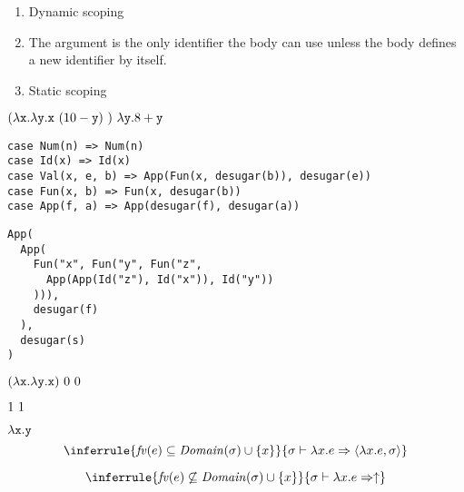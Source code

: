 \textbf{}
\begin{enumerate}
  \item Dynamic scoping
  \item The argument is the only identifier the body can use unless the body defines a new identifier by itself.
  \item Static scoping
\end{enumerate}

\textbf{}

$(\lambda\texttt{x}.\lambda\texttt{y}.\texttt{x}\ (10-\texttt{y})\ )\ \lambda\texttt{y}.8+\texttt{y}$
\\

\textbf{}
\vspace{-1em}
\begin{verbatim}
case Num(n) => Num(n)
case Id(x) => Id(x)
case Val(x, e, b) => App(Fun(x, desugar(b)), desugar(e))
case Fun(x, b) => Fun(x, desugar(b))
case App(f, a) => App(desugar(f), desugar(a))
\end{verbatim}

\textbf{}
\vspace{-1em}
\begin{verbatim}
App(
  App(
    Fun("x", Fun("y", Fun("z",
      App(App(Id("z"), Id("x")), Id("y"))
    ))),
    desugar(f)
  ),
  desugar(s)
)
\end{verbatim}

\textbf{}

$(\lambda\texttt{x}.\lambda\texttt{y}.\texttt{x})\ 0\ 0$
\\

\textbf{}

$1\ 1$
\\

\textbf{}

$\lambda\texttt{x}.\texttt{y}$
\\

\textbf{}
\[
  \inferrule
  { \embox{fv}(e)\subseteq\dom{\sigma}\cup\{x\} }
  { \evald{\efun{x}{e}}{\clov{x}{e}{\sigma}} }
\]

\[
  \inferrule
  { \embox{fv}(e)\not\subseteq\dom{\sigma}\cup\{x\} }
  { \evald{\efun{x}{e}}{\uparrow} }
\]


